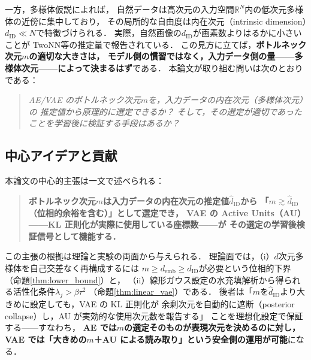 \documentclass[11pt,a4paper]{jsarticle}
\newcommand{\dID}{d_{\mathrm{ID}}}
\newcommand{\hatdID}{\hat{d}_{\mathrm{ID}}}
\newcommand{\R}{\mathbb{R}}
\newcommand{\demb}{d_{\mathrm{emb}}}
\begin{document}
一方，多様体仮説\cite{fefferman2016manifold}によれば，
自然データは高次元の入力空間$\R^N$内の低次元多様体の近傍に集中しており，
その局所的な自由度は内在次元（intrinsic dimension）$\dID \ll N$で特徴づけられる．
実際，自然画像の$\dID$が画素数よりはるかに小さいことが
TwoNN\cite{facco2017twonn}等の推定量で報告されている\cite{pope2021intrinsic}．
この見方に立てば，\textbf{ボトルネック次元$m$の適切な大きさは，
モデル側の慣習ではなく，入力データ側の量——多様体次元——によって決まるはず}である．
本論文が取り組む問いは次のとおりである：
\begin{quote}
\textit{AE/VAE のボトルネック次元$m$を，入力データの内在次元（多様体次元）の
推定値から原理的に選定できるか？
そして，その選定が適切であったことを学習後に検証する手段はあるか？}
\end{quote}

\subsection{中心アイデアと貢献}\label{sec:intro_aim}

本論文の中心的主張は一文で述べられる：
\begin{quote}
\textbf{ボトルネック次元$m$は入力データの内在次元の推定値$\hatdID$から
「$m \gtrsim \hatdID$（位相的余裕を含む）」として選定でき，
VAE の Active Units（AU）——KL 正則化が実際に使用している座標数——が
その選定の学習後検証信号として機能する．}
\end{quote}
この主張の根拠は理論と実験の両面から与えられる．
理論面では，（i）$d$次元多様体を自己交差なく再構成するには
$m \geq \demb \geq \dID$が必要という位相的下界（命題\ref{thm:lower_bound}）と，
（ii）線形ガウス設定の水充填解析から得られる活性化条件$\lambda_j > \beta\tau^2$
（命題\ref{thm:linear_vae}）である．
後者は「$m$を$\hatdID$より大きめに設定しても，VAE の KL 正則化が
余剰次元を自動的に遮断（posterior collapse）し，AU が実効的な使用次元数を報告する」
ことを理想化設定で保証する——すなわち，
\textbf{AE では$m$の選定そのものが表現次元を決めるのに対し，
VAE では「大きめの$m$＋AU による読み取り」という安全側の運用が可能}になる．
\end{document}
